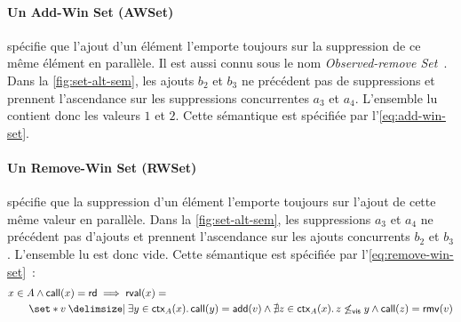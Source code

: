\paragraph{Un Add-Win Set (AWSet)~\autocite{shapiro_2011_crdt}} spécifie que l'ajout d'un élément l'emporte toujours sur la suppression de ce même élément en parallèle.
Il est aussi connu sous le nom \emph{Observed-remove Set}~\autocite{shapiro_2011_crdt}.
Dans la \autoref{fig:set-alt-sem}, les ajouts $b_2$ et $b_3$ ne précédent pas de suppressions et prennent l'ascendance sur les suppressions concurrentes $a_3$ et $a_4$.
L'ensemble lu contient donc les valeurs $1$ et $2$.
Cette sémantique est spécifiée par l'\autoref{eq:add-win-set}.

\paragraph{Un Remove-Win Set (RWSet)} spécifie que la suppression d'un élément l'emporte toujours sur l'ajout de cette même valeur en parallèle.
Dans la \autoref{fig:set-alt-sem}, les suppressions $a_3$ et $a_4$ ne précédent pas d'ajouts et prennent l'ascendance sur les ajouts concurrents $b_2$ et $b_3$.
L'ensemble lu est donc vide.
Cette sémantique est spécifiée par l'\autoref{eq:remove-win-set}~:
%
\begin{equation}\begin{split}\label{eq:remove-win-set}
\MoveEqLeft x \in A \land \trm{call}(x) = \trm{rd} \implies \trm{rval}(x) =\\
    &\set*{v \given \exists y \in \trm{ctx}_A(x) \qsep \trm{call}(y) = \trm{add}(v) \land \nexists z \in \trm{ctx}_A(x) \qsep z \not\viseq y \land \trm{call}(z) = \trm{rmv}(v)}
\end{split}\end{equation}

